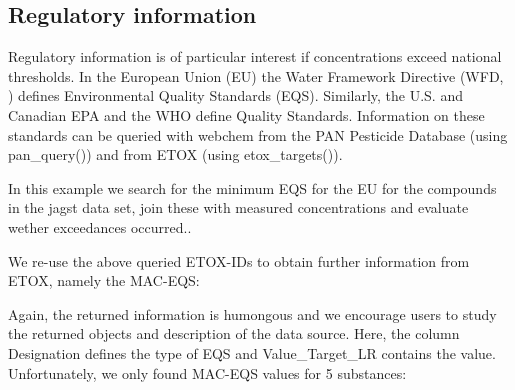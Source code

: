 \subsection[Regulatory information]{Regulatory information}
Regulatory information is of particular interest if concentrations exceed national thresholds.
In the European Union (EU) the Water Framework Directive (WFD, \citet{european_union_directive_2000}) defines Environmental Quality Standards (EQS).
Similarly, the U.S. and Canadian EPA and the WHO define Quality Standards.
Information on these standards can be queried with webchem from the PAN Pesticide Database (using pan\_query()) and from ETOX (using etox\_targets()).

In this example we search for the minimum EQS for the EU for the compounds in the jagst data set, join these with measured concentrations and evaluate wether exceedances occurred..

We re-use the above queried ETOX-IDs to obtain further information from ETOX, namely the MAC-EQS:


\begin{knitrout}
\color{fgcolor}\begin{kframe}
\begin{alltt}
 \hlkwb{<-} \hlopt{$}
\hlopt{$} \hlkwb{<-}  \hlstd{(}\hlstd{)\{}
   \hlstd{(} \hlopt{==}  \hlopt{&&} 
    \hlstd{(}\hlstd{)}
  \hlstd{\}}  \hlstd{\{}
     \hlkwb{<-} \hlopt{$}
    \hlstd{(res[res}\hlopt{$} \hlopt{==}  \hlopt{&}
              \hlopt{$} \hlopt{==} \hlstd{,} \hlstd{])}
  \hlstd{\}}
\hlstd{\})}
\end{alltt}
\end{kframe}
\end{knitrout}

Again, the returned information is humongous and we encourage users to study the returned objects and description of the data source.
Here, the column Designation defines the type of EQS and Value\_Target\_LR contains the value.
Unfortunately, we only found MAC-EQS values for 5 substances:

